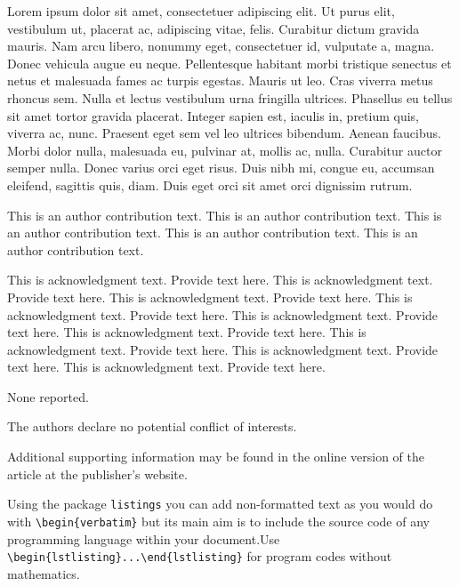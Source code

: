 \documentclass[AMA,Times1COL]{WileyNJDv5} %
\begin{document}
Lorem ipsum dolor sit amet, consectetuer adipiscing elit. Ut purus elit, vestibulum ut, placerat ac, adipiscing vitae,
felis. Curabitur dictum gravida mauris. Nam arcu libero, nonummy eget, consectetuer id, vulputate a, magna. Donec
vehicula augue eu neque. Pellentesque habitant morbi tristique senectus et netus et malesuada fames ac turpis egestas.
Mauris ut leo. Cras viverra metus rhoncus sem. Nulla et lectus vestibulum urna fringilla ultrices. Phasellus eu tellus
sit amet tortor gravida placerat. Integer sapien est, iaculis in, pretium quis, viverra ac, nunc. Praesent eget sem vel
leo ultrices bibendum. Aenean faucibus. Morbi dolor nulla, malesuada eu, pulvinar at, mollis ac, nulla. Curabitur
auctor semper nulla. Donec varius orci eget risus. Duis nibh mi, congue eu, accumsan eleifend, sagittis quis, diam.
Duis eget orci sit amet orci dignissim rutrum.


{}

This is an author contribution text. This is an author contribution text. This is an author contribution text. This is an author contribution text. This is an author contribution text.

This is acknowledgment text. \cite{Kenamond2013} Provide text here. This is acknowledgment text. Provide text here. This is acknowledgment text. Provide text here. This is acknowledgment text. Provide text here. This is acknowledgment text. Provide text here. This is acknowledgment text. Provide text here. This is acknowledgment text. Provide text here. This is acknowledgment text. Provide text here. This is acknowledgment text. Provide text here.



None reported.


The authors declare no potential conflict of interests.






Additional supporting information may be found in the
online version of the article at the publisher’s website.




\appendix

\vspace*{12pt}
Using the package {\tt listings} you can add non-formatted text as you would do with \verb|\begin{verbatim}| but its main aim is to include the source code of any programming language within your document.\newline Use \verb|\begin{lstlisting}...\end{lstlisting}| for program codes without mathematics.
\end{document}
